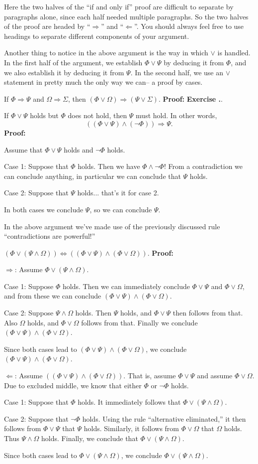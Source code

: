 \documentclass[12pt]{article}
\newcommand{\AND}{\wedge}
\newcommand{\OR}{\vee}
\newcommand{\ARR}{\Rightarrow}
\newcommand{\DARR}{\Leftrightarrow}
\newcounter{exercise}[subsubsection]
\newcounter{rule}
\def\putExerciseHeading{\refstepcounter{exercise} \textbf{Exercise \thesubsubsection.\theexercise}}
\def\putRuleNumber{\refstepcounter{rule}\therule}
\newcommand{\DRULEPF}[3]{\begin{tcolorbox}[title=Derived Rule \putRuleNumber: #1,colbacktitle=white,coltitle=black,colback=white] {#2} \tcblower \textbf{Proof:} {#3} \end{tcolorbox}}
\newcommand{\DRULEPZ}[2]{\begin{tcolorbox}[title=Derived Rule \putRuleNumber: #1,colbacktitle=white,coltitle=black,colback=white] {#2} \tcblower \textbf{Proof:} 
                         \putExerciseHeading. \end{tcolorbox}}
\def\pA{\Phi}
\def\pB{\Psi}
\def\pC{\Omega}
\def\pD{\Sigma}
\begin{document}
Here the two halves of the ``if and only if'' proof are difficult to separate by paragraphs alone, since each half needed multiple paragraphs.
So the two halves of the proof are headed by ``$\Rightarrow$'' and ``$\Leftarrow$''.
You should always feel free to use headings to separate different components of your argument.

Another thing to notice in the above argument is the way in which $\OR$ is handled.
In the first half of the argument, we establish $\pA\OR\pB$ by deducing it from $\pA$, and we also establish it by deducing it from $\pB$.
In the second half, we use an $\OR$ statement in pretty much the only way we can-- a proof by cases.

\DRULEPZ{}{If $\pA\ARR\pB$ and $\pC\ARR\pD$, then $(\pA\OR\pC)\ARR(\pB\OR\pD)$.}

\DRULEPF{Alternative Eliminated}{
If $\pA\OR\pB$ holds but $\pA$ does not hold, then $\pB$ must hold.
In other words,
$$((\pA\OR\pB)\AND(\neg\pA))\ARR\pB.$$
}{
Assume that $\pA\OR\pB$ holds and $\neg\pA$ holds.
\lsp

Case 1: Suppose that $\pA$ holds.
Then we have $\pA\AND\neg\pA$! From a contradiction we can conclude anything, in particular we can conclude that $\pB$ holds.
\lsp

Case 2: Suppose that $\pB$ holds... that's it for case 2.
\lsp

In both cases we conclude $\pB$, so we can conclude $\pB$.
}

In the above argument we've made use of the previously discussed rule ``contradictions are powerful!''


\DRULEPF{Or Distributes over And}{
$(\pA\OR(\pB\AND\pC))\DARR((\pA\OR\pB)\AND(\pA\OR\pC))$.
}{
$\Rightarrow$:
Assume $\pA\OR(\pB\AND\pC)$.
\lsp

Case 1: Suppose $\pA$ holds. Then we can immediately conclude $\pA\OR\pB$ and $\pA\OR\pC$, and from these
we can conclude $(\pA\OR\pB)\AND(\pA\OR\pC)$.
\lsp

Case 2: Suppose $\pB\AND\pC$ holds.
Then $\pB$ holds, and $\pA\OR\pB$ then follows from that.
Also $\pC$ holds, and $\pA\OR\pC$ follows from that.
Finally we conclude $(\pA\OR\pB)\AND(\pA\OR\pC)$.
\lsp

Since both cases lead to $(\pA\OR\pB)\AND(\pA\OR\pC)$, we conclude $(\pA\OR\pB)\AND(\pA\OR\pC)$.
\lsp

$\Leftarrow$: Assume $((\pA\OR\pB)\AND(\pA\OR\pC))$.
That is, assume $\pA\OR\pB$ and assume $\pA\OR\pC$.
Due to excluded middle, we know that either $\pA$ or $\neg\pA$ holds.
\lsp

Case 1: Suppose that $\pA$ holds. It immediately follows that $\pA\OR(\pB\AND\pC)$.
\lsp

Case 2: Suppose that $\neg\pA$ holds. Using the rule ``alternative eliminated,''
it then follows from $\pA\OR\pB$ that $\pB$ holds.
Similarly, it follows from $\pA\OR\pC$ that $\pC$ holds. Thus $\pB\AND\pC$ holds.
Finally, we conclude that $\pA\OR(\pB\AND\pC)$.
\lsp

Since both cases lead to $\pA\OR(\pB\AND\pC)$, we conclude $\pA\OR(\pB\AND\pC)$.
}
\end{document}
